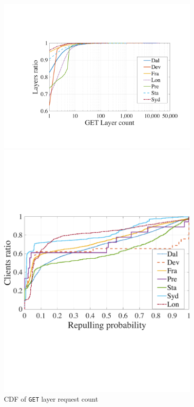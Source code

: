 
\begin{figure}[t]
        \centering
        \begin{minipage}{0.3\textwidth}
                \centering
                \includegraphics[width=0.9\textwidth]{graphs/cdf-layer-repull-ratio-by-same-client.pdf}
                \caption{CDF of \texttt{GET} layer request count}
                \label{fig:layer-repull-cdf}
        \end{minipage}%
	\hfill
        \begin{minipage}{0.3\textwidth}
                \centering
                \includegraphics[width=0.9\textwidth]{graphs/cdf-client-repull-layer-request-ratio.pdf}

\end{minipage}
\end{figure}
